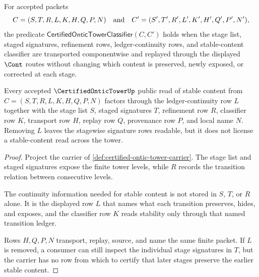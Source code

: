 \begin{definition}
\label{def:certified-ontic-tower-classifier}
For accepted packets
$$
C=(S,T,R,L,K,H,Q,P,N)
\quad\hbox{and}\quad
C'=(S',T',R',L',K',H',Q',P',N'),
$$
the predicate $\mathsf{CertifiedOnticTowerClassifier}(C,C')$ holds when the stage list, staged signatures, refinement rows, ledger-continuity rows, and stable-content classifier are transported componentwise and replayed through the displayed $\Cont$ routes without changing which content is preserved, newly exposed, or corrected at each stage.
\end{definition}

\begin{theorem}
\label{thm:certified-ontic-tower-ledger-continuity}
Every accepted $\CertifiedOnticTowerUp$ public read of stable content from $C=(S,T,R,L,K,H,Q,P,N)$ factors through the ledger-continuity row $L$ together with the stage list $S$, staged signatures $T$, refinement row $R$, classifier row $K$, transport row $H$, replay row $Q$, provenance row $P$, and local name $N$. Removing $L$ leaves the stagewise signature rows readable, but it does not license a stable-content read across the tower.
\end{theorem}
\begin{proof}
Project the carrier of \autoref{def:certified-ontic-tower-carrier}. The stage list and staged signatures expose the finite tower levels, while $R$ records the transition relation between consecutive levels.

The continuity information needed for stable content is not stored in $S$, $T$, or $R$ alone. It is the displayed row $L$ that names what each transition preserves, hides, and exposes, and the classifier row $K$ reads stability only through that named transition ledger.

Rows $H,Q,P,N$ transport, replay, source, and name the same finite packet. If $L$ is removed, a consumer can still inspect the individual stage signatures in $T$, but the carrier has no row from which to certify that later stages preserve the earlier stable content.
\end{proof}

